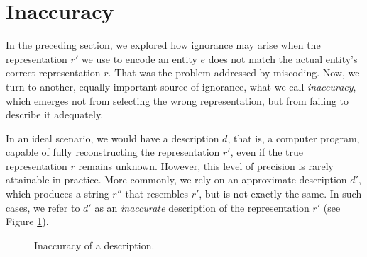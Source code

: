 %
%

\section{Inaccuracy}
\label{sec:introduction:inaccuracy}

In the preceding section, we explored how ignorance may arise when the representation $r'$ we use to encode an entity $e$ does not match the actual entity's correct representation $r$. That was the problem addressed by miscoding. Now, we turn to another, equally important source of ignorance, what we call \emph{inaccuracy}, which emerges not from selecting the wrong representation, but from failing to describe it adequately.


In an ideal scenario, we would have a description $d$, that is, a computer program, capable of fully reconstructing the representation $r'$, even if the true representation $r$ remains unknown. However, this level of precision is rarely attainable in practice. More commonly, we rely on an approximate description $d'$, which produces a string $r''$ that resembles $r'$, but is not exactly the same. In such cases, we refer to $d'$ as an \emph{inaccurate} description of the representation $r'$ (see Figure \ref{fig:inaccuracy:inaccuracy:inaccuracy}).

\begin{figure}[t]
\centering
{}
\caption{\label{fig:inaccuracy:inaccuracy:inaccuracy}Inaccuracy of a description.}
\end{figure}

